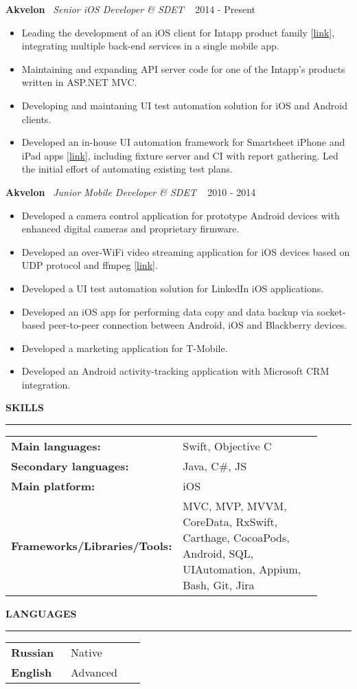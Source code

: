 \documentclass{article}
\newcommand{\cvsection}[1]{
  \vspace{2.6ex}
  \noindent\textbf{\large{\uppercase{#1}}}
  \vspace{1ex}
  \hrule
  \vspace{1.5ex}
}
\newcommand{\cvparagraph}[3]{
  \noindent\indent
  \textbf{#1}
  \ 
  \textit{#2}
  \ 
  \hfill{}
  {#3}\vspace{1ex}
}
\begin{document}
\cvparagraph{Akvelon}{Senior iOS Developer \& SDET}{2014 - Present}
\begin{itemize}[topsep=0ex,leftmargin=*,itemsep=0ex,parsep=1ex]
  \item Leading the development of an iOS client for Intapp product family [\href{https://itunes.apple.com/us/app/intapp/id1052877767}{link}], integrating multiple back-end services in a single mobile app.
  \item Maintaining and expanding API server code for one of the Intapp's products written in ASP.NET MVC.
  \item Developing and maintaning UI test automation solution for iOS and Android clients.
  \item Developed an in-house UI automation framework for Smartsheet iPhone and iPad apps [\href{https://itunes.apple.com/us/app/smartsheet/id568421135}{link}], including fixture server and CI with report gathering. Led the initial effort of automating existing test plans.
\end{itemize}
\vspace{1ex}
\cvparagraph{Akvelon}{Junior Mobile Developer \& SDET}{2010 - 2014}
\begin{itemize}[topsep=0ex,leftmargin=*,itemsep=0ex,parsep=1ex]
  \item Developed a camera control application for prototype Android devices with enhanced digital cameras and proprietary firmware.
  \item Developed an over-WiFi video streaming application for iOS devices based on UDP protocol and ffmpeg [\href{http://neuronbeta.com/chirpglobal/chirpvision/app/}{link}].
  \item Developed a UI test automation solution for LinkedIn iOS applications.
  \item Developed an iOS app for performing data copy and data backup via socket-based peer-to-peer connection between Android, iOS and Blackberry devices.
  \item Developed a marketing application for T-Mobile.
  \item Developed an Android activity-tracking application with Microsoft CRM integration.
\end{itemize}

\cvsection{Skills}
{\renewcommand{\arraystretch}{1.2}
\begin{tabular}{p{0.4\linewidth}p{0.5\linewidth}}
  \textbf{Main languages:} & Swift, Objective C \\
  \textbf{Secondary languages:} & Java, C\#, JS \\
  \textbf{Main platform:} & iOS \\
  \textbf{Frameworks/Libraries/Tools:} & MVC, MVP, MVVM, CoreData, RxSwift, Carthage, CocoaPods, Android, SQL, UIAutomation, Appium, Bash, Git, Jira
\end{tabular}}

\cvsection{Languages}
{\renewcommand{\arraystretch}{1.2}
\begin{tabular}{p{0.4\linewidth}p{0.5\linewidth}}
  \textbf{Russian} & Native \\
  \textbf{English} & Advanced \\
\end{tabular}}
\end{document}
